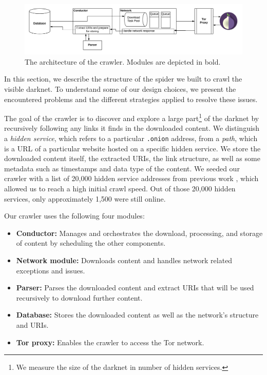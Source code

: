 \iflncs
\begin{figure}[H]
\centering
\includegraphics[width=\linewidth]{images/ArchitecturalSchema.png}
\caption{The architecture of the crawler. Modules are depicted in bold.~\cite{Loconte}}
\label{fig:scraperArchitecture}
\end{figure}
\fi
In this section, we describe the structure of the spider we built to crawl the visible darknet. To understand some of our design choices, we present the encountered problems and the different strategies applied to resolve these issues. 

The goal of the crawler is to discover and explore a large part\footnote{We measure the size of the darknet in number of hidden services.} of the darknet by recursively following any links it finds in the downloaded content. We distinguish a \emph{hidden service}, which refers to a particular \texttt{.onion} address, from a \emph{path}, which is a URL of a particular website hosted on a specific hidden service.  We store the downloaded content itself, the extracted URIs, the link structure, as well as some metadata such as timestamps and data type of the content.
We seeded our crawler with a list of 20,000 hidden service addresses from previous work \cite{Kadianakis2017}, which allowed us to reach a high initial crawl speed. Out of those 20,000 hidden services, only approximately 1,500 were still online. 

Our crawler uses the following four modules:
\begin{itemize}
    \item \textbf{Conductor:} Manages and orchestrates the download, processing, and storage of content by scheduling the other components.
    \item \textbf{Network module:} Downloads content and handles network related exceptions and issues.
    \item \textbf{Parser:} Parses the downloaded content and extract URIs that will be used recursively to download further content.
    \item \textbf{Database:} Stores the downloaded content as well as the network's structure and URIs.
    \item \textbf{Tor proxy:} Enables the crawler to access the Tor network. 
\end{itemize}

